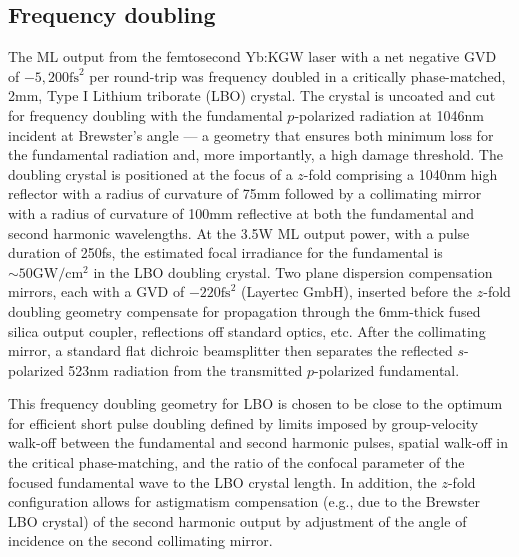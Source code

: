 
\subsection{Frequency doubling}


The ML output from the femtosecond Yb:KGW laser with a net negative GVD of $-5,200\text{fs}^2$ per round-trip was frequency doubled in a critically phase-matched, 2mm, Type I Lithium triborate (LBO) crystal.
The crystal is uncoated and cut for frequency doubling with the fundamental $p$-polarized radiation at 1046nm incident at Brewster’s angle --- a geometry that ensures both minimum loss for the fundamental radiation and, more importantly, a high damage threshold.
The doubling crystal is positioned at the focus of a $z$-fold comprising a 1040nm high reflector with a radius of curvature of 75mm followed by a collimating mirror with a radius of curvature of 100mm reflective at both the fundamental and second harmonic wavelengths.
At the 3.5W ML output power, with a pulse duration of 250fs, the estimated focal irradiance for the fundamental is $\sim50\text{GW}/\text{cm}^2$ in the LBO doubling crystal.
Two plane dispersion compensation mirrors, each with a GVD of $-220\text{fs}^2$ (Layertec GmbH\cite{website_layertec}), inserted before the $z$-fold doubling geometry compensate for propagation through the 6mm-thick fused silica output coupler, reflections off standard optics, etc.
After the collimating
mirror, a standard flat dichroic beamsplitter then separates the reflected $s$-polarized 523nm radiation from the transmitted $p$-polarized fundamental.

This frequency doubling geometry for LBO is chosen to be close to the optimum for efficient short pulse doubling \cite{wang_efficiency_2003,Saltiel_second_harmonic_2004} defined by limits imposed by group-velocity walk-off between the fundamental and second harmonic pulses, spatial walk-off in the critical phase-matching, and the ratio of the confocal parameter of the focused fundamental wave to the LBO crystal length.
In addition, the $z$-fold configuration allows for astigmatism compensation (e.g., due to the Brewster LBO crystal) of the second harmonic output by adjustment of the angle of incidence on the second collimating mirror.

